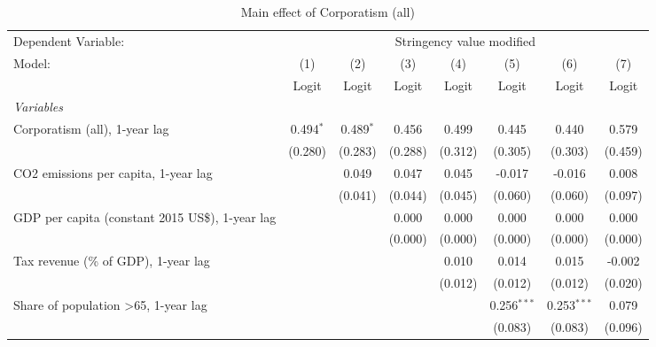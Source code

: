 
\begin{table}[htbp]
   \caption{Main effect of Corporatism (all)}
   \centering
   \begin{tabular}{lccccccc}
      \toprule
      Dependent Variable: & \multicolumn{7}{c}{Stringency value modified}\\
      Model:                                                & (1)         & (2)         & (3)     & (4)     & (5)           & (6)           & (7)\\  
                                                            &  Logit      & Logit       & Logit   & Logit   & Logit         & Logit         & Logit\\  
      \midrule
      \emph{Variables}\\
      Corporatism (all), 1-year lag                         & 0.494$^{*}$ & 0.489$^{*}$ & 0.456   & 0.499   & 0.445         & 0.440         & 0.579\\   
                                                            & (0.280)     & (0.283)     & (0.288) & (0.312) & (0.305)       & (0.303)       & (0.459)\\   
      CO2 emissions per capita, 1-year lag                  &             & 0.049       & 0.047   & 0.045   & -0.017        & -0.016        & 0.008\\   
                                                            &             & (0.041)     & (0.044) & (0.045) & (0.060)       & (0.060)       & (0.097)\\   
      GDP per capita (constant 2015 US\$), 1-year lag       &             &             & 0.000   & 0.000   & 0.000         & 0.000         & 0.000\\   
                                                            &             &             & (0.000) & (0.000) & (0.000)       & (0.000)       & (0.000)\\   
      Tax revenue (\% of GDP), 1-year lag                   &             &             &         & 0.010   & 0.014         & 0.015         & -0.002\\   
                                                            &             &             &         & (0.012) & (0.012)       & (0.012)       & (0.020)\\   
      Share of population >65, 1-year lag                   &             &             &         &         & 0.256$^{***}$ & 0.253$^{***}$ & 0.079\\   
                                                            &             &             &         &         & (0.083)       & (0.083)       & (0.096)\\   

\end{tabular}
\end{table}
